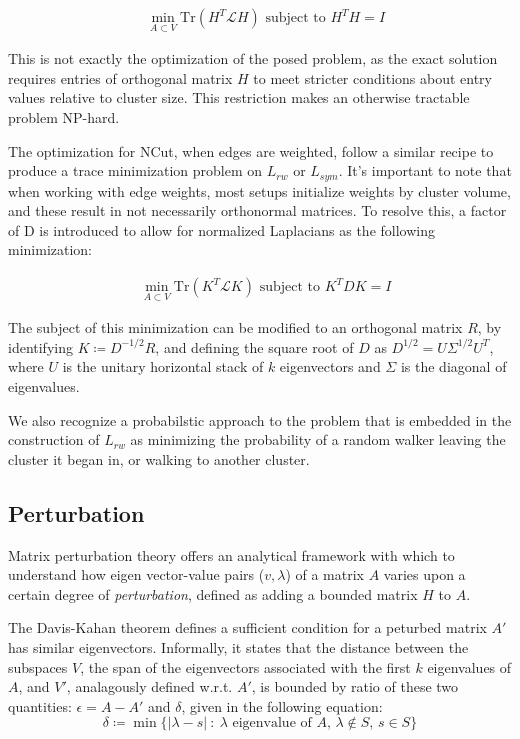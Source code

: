 \documentclass[letterpaper,12pt]{article}
\begin{document}
\begin{align}
   &\min_{A \subset V} \text{Tr}(H^T \mathcal{L} H) \text{ subject to $H^T H = I$}  
\end{align}

This is not exactly the optimization of the posed problem, as the exact solution requires entries of orthogonal matrix $H$ to meet stricter conditions about entry values relative to cluster size. This restriction makes an otherwise tractable problem NP-hard.

\noindent
The optimization for NCut, when edges are weighted, follow a similar recipe to produce a trace minimization problem on $L_{rw}$ or $L_{sym}$. It's important to note that when working with edge weights, most setups initialize weights by cluster volume, and these result in not necessarily orthonormal matrices. To resolve this, a factor of D is introduced to allow for normalized Laplacians as the following minimization:

\begin{align}
   &\min_{A \subset V} \text{Tr}(K^T \mathcal{L} K) \text{ subject to $K^T D K = I$}  
\end{align}

The subject of this minimization can be modified to an orthogonal matrix $R$, by identifying $K\coloneqq D^{-1/2}R$, and defining the square root of $D$ as $D^{1/2} = U \Sigma^{1/2} U^T$, where $U$ is the unitary horizontal stack of $k$ eigenvectors and $\Sigma$ is the diagonal of eigenvalues.

We also recognize a probabilstic approach to the problem that is embedded in the construction of $L_{rw}$ as minimizing the probability of a random walker leaving the cluster it began in, or walking to another cluster.

\subsection*{Perturbation}

Matrix perturbation theory offers an analytical framework with which to understand how eigen vector-value pairs ($v,\lambda$) of a matrix $A$ varies upon a certain degree of \textit{perturbation}, defined as adding a bounded matrix $H$ to $A$.

The Davis-Kahan theorem defines a sufficient condition for a peturbed matrix $A'$ has similar eigenvectors. Informally, it states that the distance between the subspaces $V$, the span of the eigenvectors associated with the first $k$ eigenvalues of $A$, and $V'$, analagously defined w.r.t. $A'$, is bounded by ratio of these two quantities: $\epsilon = A - A'$ and $\delta$, given in the following equation:
\begin{equation}
    \delta \coloneqq \min\{ |\lambda - s | \ : \  \text{$\lambda$ eigenvalue of $A$, $\lambda \not \in S$, $s \in S$} \}
\end{equation}
\end{document}
